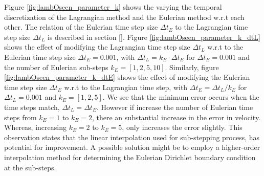 Figure \ref{fig:lambOseen_parameter_k} shows the varying the temporal discretization of the Lagrangian method and the Eulerian method w.r.t each other. The relation of the Eulerian time step size $\Delta t_E$ to the Lagrangian time step size $\Delta t_L$ is described in section \ref{}. Figure \ref{fig:lambOseen_parameter_k_dtL} shows the effect of modifying the Lagrangian time step size $\Delta t_L$ w.r.t to the Eulerian time step size $\Delta t_E=0.001$, with $\Delta t_L = k_E\cdot\Delta t_E$ for $\Delta t_E = 0.001$ and the number of Eulerian sub-steps $k_E = [1,2,5,10]$. Similarly, figure \ref{fig:lambOseen_parameter_k_dtE} shows the effect of modifying the Eulerian time step size $\Delta t_E$ w.r.t to the Lagrangian time step, with $\Delta t_E = \Delta t_L/k_E$ for $\Delta t_L=0.001$ and $k_E = [1,2,5]$. We see that the minimum error occurs when the time steps match, $\Delta t_L = \Delta t_E$. However if increase the number of Eulerian time steps from $k_E = 1 $ to $k_E=2$, there an substantial increase in the error in velocity. Whereas, increasing $k_E=2$ to $k_E=5$, only increases the error slightly. This observation states that the linear interpolation used for sub-stepping process, has potential for improvement. A possible solution might be to employ a higher-order interpolation method for determining the Eulerian Dirichlet boundary condition at the sub-steps.

